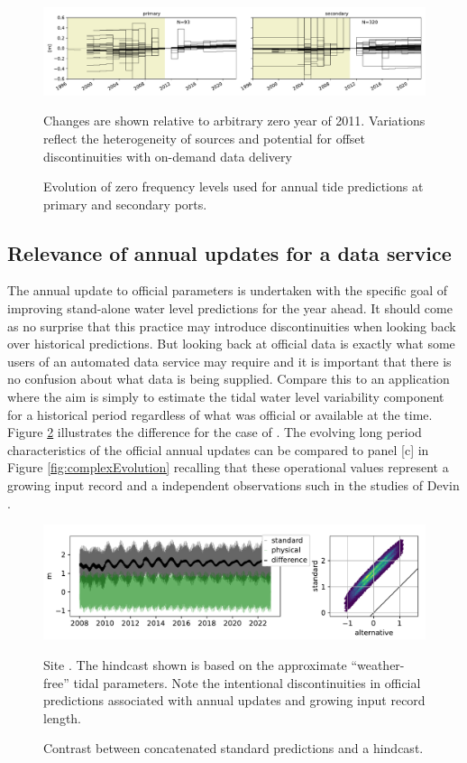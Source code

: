 \begin{figure}[!hbt] \centering
    \includegraphics[width=\figwidthFull]{figures/plots/Z0_evolution.pdf}
        \caption{Evolution of zero frequency levels used for annual tide predictions at primary and secondary ports.}
        {Changes are shown relative to arbitrary zero year of 2011. Variations reflect the heterogeneity of sources and potential for offset discontinuities with on-demand data delivery}
    \label{fig:z0Evolution}
\end{figure}   

\subsection{Relevance of annual updates for a data service}
The annual update to official parameters is undertaken with the specific goal of improving stand-alone water level predictions for the year ahead.  It should come as no surprise that this practice may introduce discontinuities when looking back over historical predictions.
But looking back at official data is exactly what some users of an automated data service may require and it is important that there is no confusion about what data is being supplied.
Compare this to an application where the aim is simply to estimate the tidal water level variability component  for a historical period regardless of what was official or available at the time.
Figure \ref{fig:tideHistoryTs} illustrates the difference for the case of  \Dname{}.  The evolving long period characteristics of the official annual updates can be compared to panel [c] in Figure \ref{fig:complexEvolution} recalling that these operational values represent a growing input record and a independent observations such in the studies of Devin \citep{10.1002/2017jc013165}. 

\begin{figure}[!hbt] \centering
    \includegraphics[width=\figwidthFull]{figures/plots/piecewiseTide_62430.pdf}
        \caption{Contrast between concatenated standard predictions and a hindcast.}
        {Site \Dname{}. The hindcast shown is based on the approximate ``weather-free'' tidal parameters.  Note the intentional discontinuities in official predictions associated with annual updates and growing input record length.}
    \label{fig:tideHistoryTs}
\end{figure}   

